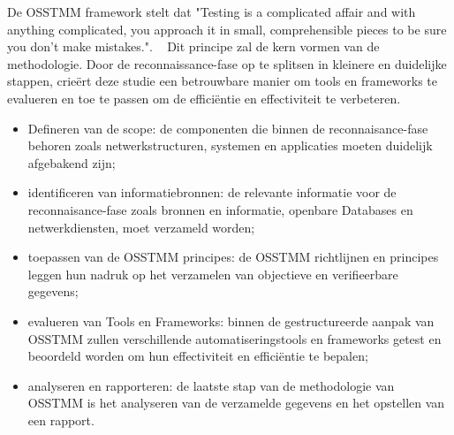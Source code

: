 De OSSTMM framework stelt dat "Testing is a complicated affair and with anything complicated, you approach it in small, comprehensible pieces to be sure you don’t make mistakes.". ~\autocite{Herzog}
Dit principe zal de kern vormen van de methodologie. 
Door de reconnaissance-fase op te splitsen in kleinere en duidelijke stappen, crieërt deze studie een betrouwbare manier om tools en frameworks te evalueren en toe te passen om de efficiëntie en effectiviteit te verbeteren.

\begin{itemize}
    \item Defineren van de scope: 
    de componenten die binnen de reconnaisance-fase behoren zoals netwerkstructuren, systemen en applicaties moeten duidelijk afgebakend zijn;
    \item identificeren van informatiebronnen:
    de relevante informatie voor de reconnaisance-fase zoals bronnen en informatie, openbare Databases en netwerkdiensten, moet verzameld worden; 
    \item toepassen van de OSSTMM principes:
    de OSSTMM richtlijnen en principes leggen hun nadruk op het verzamelen van objectieve en verifieerbare gegevens;
    \item evalueren van Tools en Frameworks:
    binnen de gestructureerde aanpak van OSSTMM zullen verschillende automatiseringstools en frameworks getest en beoordeld worden om hun effectiviteit en efficiëntie te bepalen;
    \item analyseren en rapporteren:
    de laatste stap van de methodologie van OSSTMM is het analyseren van de verzamelde gegevens en het opstellen van een rapport.
\end{itemize}



